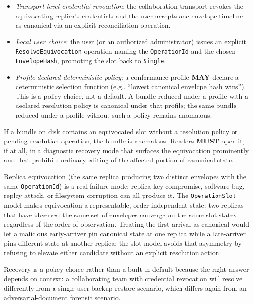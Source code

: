 \documentclass[11pt,letterpaper]{report}
\newcounter{requirement}[chapter]
\newcommand{\MUST}{\textbf{MUST}}
\newcommand{\MAY}{\textbf{MAY}}
\begin{document}
\begin{requirement}
  \begin{itemize}
    \item \emph{Transport-level credential revocation}: the
      collaboration transport revokes the equivocating replica's
      credentials and the user accepts one envelope timeline as
      canonical via an explicit reconciliation operation.
    \item \emph{Local user choice}: the user (or an authorized
      administrator) issues an explicit
      \texttt{ResolveEquivocation} operation naming the
      \texttt{OperationId} and the chosen
      \texttt{EnvelopeHash}, promoting the slot back to
      \texttt{Single}.
    \item \emph{Profile-declared deterministic policy}: a
      conformance profile \MAY{} declare a deterministic
      selection function (e.g., ``lowest canonical envelope
      hash wins''). This is a policy choice, not a default. A
      bundle reduced under a profile with a declared resolution
      policy is canonical under that profile; the same bundle
      reduced under a profile without such a policy remains
      anomalous.
  \end{itemize}

  If a bundle on disk contains an equivocated slot without a
  resolution policy or pending resolution operation, the bundle
  is anomalous. Readers \MUST{} open it, if at all, in a
  diagnostic recovery mode that surfaces the equivocation
  prominently and that prohibits ordinary editing of the
  affected portion of canonical state.
\end{requirement}

\begin{rationale}
  Replica equivocation (the same replica producing two distinct
  envelopes with the same \texttt{OperationId}) is a real
  failure mode: replica-key compromise, software bug, replay
  attack, or filesystem corruption can all produce it. The
  \texttt{OperationSlot} model makes equivocation a
  representable, order-independent state: two replicas that
  have observed the same set of envelopes converge on the same
  slot states regardless of the order of observation. Treating
  the first arrival as canonical would let a malicious
  early-arriver pin canonical state at one replica while a
  late-arriver pins different state at another replica; the
  slot model avoids that asymmetry by refusing to elevate
  either candidate without an explicit resolution action.

  Recovery is a policy choice rather than a built-in default
  because the right answer depends on context: a collaborating
  team with credential revocation will resolve differently
  from a single-user backup-restore scenario, which differs
  again from an adversarial-document forensic scenario.
\end{rationale}
\end{document}
